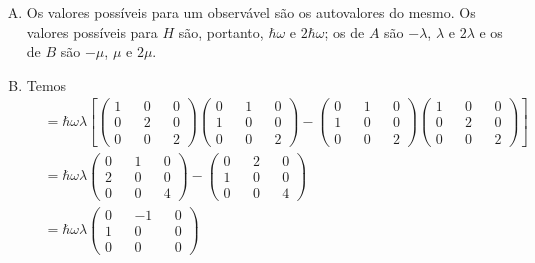 \documentclass[a4paper, 12pt, notitlepage]{article}
\begin{document}
\begin{enumerate}
\begin{enumerate}[(A)]
  \item Os valores possíveis para um observável são os autovalores do mesmo. Os valores possíveis para $H$ são, portanto, $\hbar \omega$ e $2\hbar \omega$; os de $A$ são $-\lambda$, $\lambda$ e $2\lambda$ e os de $B$ são $-\mu$, $\mu$ e $2\mu$.
  
  \item Temos
  \begin{align*}
  [H, A] &= \hbar \omega \lambda \left[ 
  \begin{pmatrix} 
  1 && 0 && 0 \\
  0 && 2 && 0 \\
  0 && 0 && 2
  \end{pmatrix}\begin{pmatrix}
  0 && 1 && 0 \\
  1 && 0 && 0 \\
  0 && 0 && 2  
  \end{pmatrix} - \begin{pmatrix}
  0 && 1 && 0 \\
  1 && 0 && 0 \\
  0 && 0 && 2  
  \end{pmatrix} \begin{pmatrix} 
  1 && 0 && 0 \\
  0 && 2 && 0 \\
  0 && 0 && 2
  \end{pmatrix}\right] \\
  &= \hbar \omega \lambda\begin{pmatrix}
  0 && 1 && 0 \\
  2 && 0 && 0 \\
  0 && 0 && 4
  \end{pmatrix} - \begin{pmatrix}
  0 && 2 && 0 \\
  1 && 0 && 0 \\
  0 && 0 && 4
  \end{pmatrix} \\
  &= \hbar \omega \lambda\begin{pmatrix}
  0 && -1 && 0 \\
  1 && 0 && 0 \\
  0 && 0 && 0
  \end{pmatrix}
  \end{align*}
  

\end{enumerate}
\end{enumerate}
\end{document}
